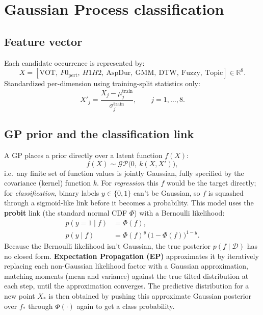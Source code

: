 \documentclass[11pt]{article}
\begin{document}
\section{Gaussian Process classification}

\subsection{Feature vector}
Each candidate occurrence is represented by:
\begin{equation}
X = [\text{VOT},\ F0_{\text{pert}},\ H1H2,\ \text{AspDur},\ \text{GMM},\ \text{DTW},\ \text{Fuzzy},\ \text{Topic}] \in \mathbb{R}^8.
\end{equation}
Standardized per-dimension using training-split statistics only:
\begin{equation}
X'_j = \frac{X_j - \mu_j^{\text{train}}}{\sigma_j^{\text{train}}}, \qquad j = 1, \ldots, 8.
\label{eq:standardize}
\end{equation}

\subsection{GP prior and the classification link}
A GP places a prior directly over a latent function $f(X)$:
\begin{equation}
f(X) \sim \mathcal{GP}\big(0,\ k(X, X')\big),
\end{equation}
i.e.\ any finite set of function values is jointly Gaussian, fully
specified by the covariance (kernel) function $k$. For \emph{regression}
this $f$ would be the target directly; for \emph{classification}, binary
labels $y \in \{0,1\}$ can't be Gaussian, so $f$ is squashed through a
sigmoid-like link before it becomes a probability. This model uses the
\textbf{probit} link (the standard normal CDF $\Phi$) with a Bernoulli
likelihood:
\begin{align}
p(y=1 \mid f) &= \Phi(f), \\
p(y \mid f) &= \Phi(f)^y \, \big(1-\Phi(f)\big)^{1-y}.
\end{align}
Because the Bernoulli likelihood isn't Gaussian, the true posterior
$p(f \mid \mathcal{D})$ has no closed form. \textbf{Expectation
Propagation (EP)} approximates it by iteratively replacing each
non-Gaussian likelihood factor with a Gaussian approximation, matching
moments (mean and variance) against the true tilted distribution at each
step, until the approximation converges. The predictive distribution for
a new point $X_*$ is then obtained by pushing this approximate Gaussian
posterior over $f_*$ through $\Phi(\cdot)$ again to get a class
probability.
\end{document}
